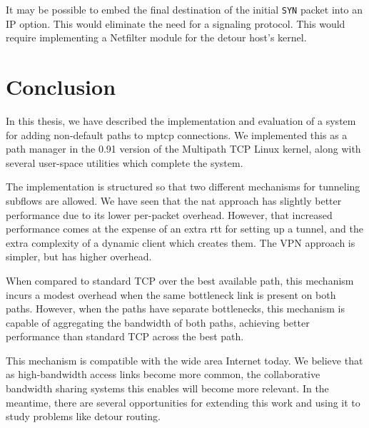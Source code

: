\documentclass{cwru}
\begin{document}
It may be possible to embed the final destination of the initial \texttt{SYN}
packet into an IP option. This would eliminate the need for a signaling
protocol. This would require implementing a Netfilter module for the detour
host's kernel.

\chapter{Conclusion}
\label{c:conclusion}

In this thesis, we have described the implementation and evaluation of a system
for adding non-default paths to \ac{mptcp} connections. We implemented this as a
path manager in the 0.91 version of the Multipath TCP Linux kernel, along with
several user-space utilities which complete the system.

The implementation is structured so that two different mechanisms for tunneling
subflows are allowed. We have seen that the \ac{nat} approach has slightly
better performance due to its lower per-packet overhead. However, that increased
performance comes at the expense of an extra \ac{rtt} for setting up a tunnel,
and the extra complexity of a dynamic client which creates them. The VPN
approach is simpler, but has higher overhead.

When compared to standard TCP over the best available path, this mechanism
incurs a modest overhead when the same bottleneck link is present on both paths.
However, when the paths have separate bottlenecks, this mechanism is capable of
aggregating the bandwidth of both paths, achieving better performance than
standard TCP across the best path.

This mechanism is compatible with the wide area Internet today. We believe that
as high-bandwidth access links become more common, the collaborative bandwidth
sharing systems this enables will become more relevant. In the meantime, there
are several opportunities for extending this work and using it to study problems
like detour routing.

\backmatter
\appendix



\end{document}
